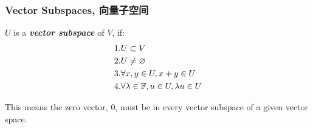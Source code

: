\subsubsection{Vector Subspaces, 向量子空间}
\begin{definition}
    $U$ is a \textbf{\textit{vector subspace}} of $V$, if:
    \begin{align*}
        & 1. U \subset V \\
        & 2. U \ne \varnothing \\
        & 3. \forall x, y \in U, x + y \in U \\
        & 4. \forall \lambda \in \mathbb{F}, u \in U, \lambda u \in U
    \end{align*}
\end{definition}
This means the zero vector, $0$, must be in every vector subspace of a given vector space.
\newpage

